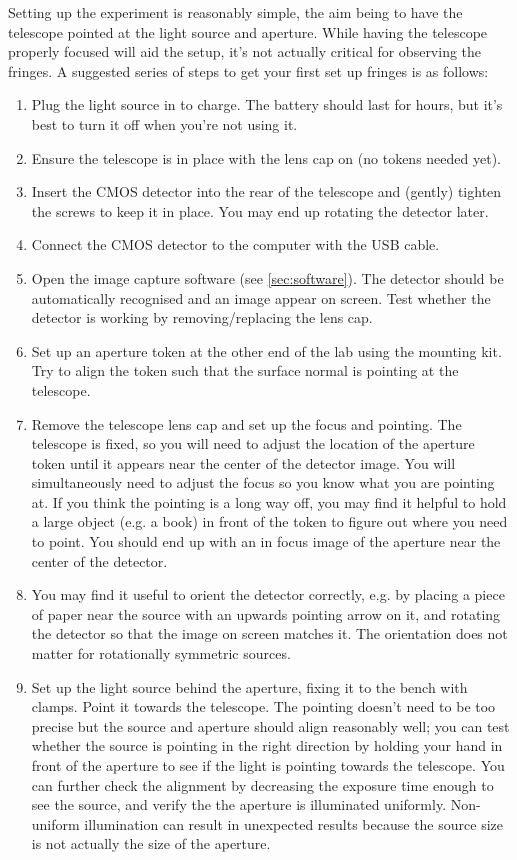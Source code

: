 \documentclass[11pt]{article}
\begin{document}
Setting up the experiment is reasonably simple, the aim being to have the telescope pointed at the light source and aperture. While having the telescope properly focused will aid the setup, it's not actually critical for observing the fringes. A suggested series of steps to get your first set up fringes is as follows:

\begin{enumerate}
    \item Plug the light source in to charge. The battery should last for hours, but it's best to turn it off when you're not using it.
    \item Ensure the telescope is in place with the lens cap on (no tokens needed yet).
    \item Insert the CMOS detector into the rear of the telescope and (gently) tighten the screws to keep it in place. You may end up rotating the detector later.
    \item Connect the CMOS detector to the computer with the USB cable.
    \item Open the image capture software (see \ref{sec:software}). The detector should be automatically recognised and an image appear on screen. Test whether the detector is working by removing/replacing the lens cap.
    \item Set up an aperture token at the other end of the lab using the mounting kit. Try to align the token such that the surface normal is pointing at the telescope.
    \item Remove the telescope lens cap and set up the focus and pointing. The telescope is fixed, so you will need to adjust the location of the aperture token until it appears near the center of the detector image. You will simultaneously need to adjust the focus so you know what you are pointing at. If you think the pointing is a long way off, you may find it helpful to hold a large object (e.g. a book) in front of the token to figure out where you need to point. You should end up with an in focus image of the aperture near the center of the detector.
    \item You may find it useful to orient the detector correctly, e.g. by placing a piece of paper near the source with an upwards pointing arrow on it, and rotating the detector so that the image on screen matches it. The orientation does not matter for rotationally symmetric sources.
    \item Set up the light source behind the aperture, fixing it to the bench with clamps. Point it towards the telescope. The pointing doesn't need to be too precise but the source and aperture should align reasonably well; you can test whether the source is pointing in the right direction by holding your hand in front of the aperture to see if the light is pointing towards the telescope. You can further check the alignment by decreasing the exposure time enough to see the source, and verify the the aperture is illuminated uniformly. Non-uniform illumination can result in unexpected results because the source size is not actually the size of the aperture.

\end{enumerate}
\end{document}
